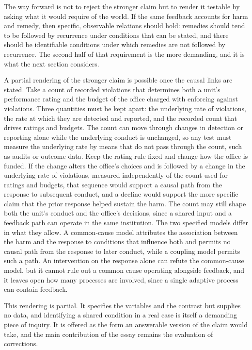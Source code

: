 \documentclass[11pt]{article}
\theoremstyle{definition}
\begin{document}
The way forward is not to reject the stronger claim but to render it testable by asking what it would require of the world. If the same feedback accounts for harm and remedy, then specific, observable relations should hold: remedies should tend to be followed by recurrence under conditions that can be stated, and there should be identifiable conditions under which remedies are not followed by recurrence. The second half of that requirement is the more demanding, and it is what the next section considers.

A partial rendering of the stronger claim is possible once the causal links are stated. Take a count of recorded violations that determines both a unit's performance rating and the budget of the office charged with enforcing against violations. Three quantities must be kept apart: the underlying rate of violations, the rate at which they are detected and reported, and the recorded count that drives ratings and budgets. The count can move through changes in detection or reporting alone while the underlying conduct is unchanged, so any test must measure the underlying rate by means that do not pass through the count, such as audits or outcome data. Keep the rating rule fixed and change how the office is funded. If the change alters the office's choices and is followed by a change in the underlying rate of violations, measured independently of the count used for ratings and budgets, that sequence would support a causal path from the response to subsequent conduct, and a decline would support the more specific claim that the prior response helped sustain the harm. The count may still shape both the unit's conduct and the office's decisions, since a shared input and a feedback path can operate in the same institution. The two specified models differ in what they allow. A common-cause model attributes the association between the harm and the response to conditions that influence both and permits no causal path from the response to later conduct, while a coupling model permits such a path. An intervention on the response alone can refute the common-cause model, but it cannot rule out a common cause operating alongside feedback, and it leaves open how many processes are involved, since a single adaptive process can contain feedback.

This rendering is partial. It specifies the variables and the contrast but supplies no data, and identifying a shared condition in a real case is itself a demanding piece of inquiry. It is offered as the form an answerable version of the claim would take, and the main contribution of the essay remains the evaluation of corrections.
\end{document}
